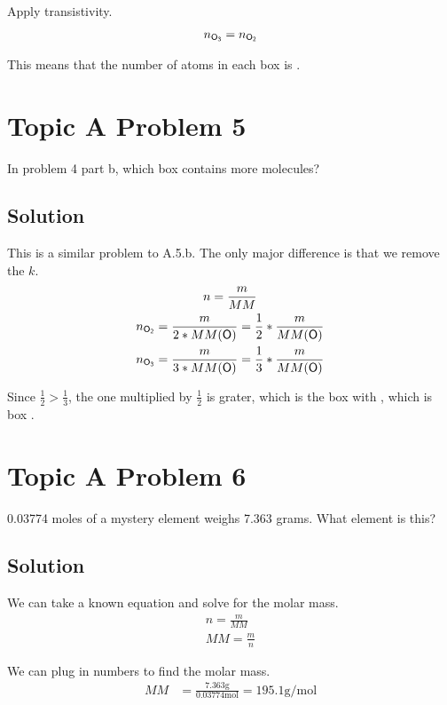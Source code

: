 \documentclass[10pt]{article}
\begin{document}
            Apply transistivity.
            \begin{gather}
                n_{\ce{O3}}   =   n_{\ce{O2}}
            \end{gather}

            This means that the number of atoms in each box is .


    \pagebreak
    \section{Topic A Problem 5}
        In problem 4 part b, which box contains more molecules?
        
        \subsection{Solution}
            This is a similar problem to A.5.b.
            The only major difference is that we remove the $k$.
            \begin{gather}
                n   =   \frac{m}{MM}\\
                n_{\ce{O2}} =   \frac{m}{2 * MM(\ce{O})} = \frac{1}{2} * \frac{m}{MM(\ce{O})}\\
                n_{\ce{O3}} =   \frac{m}{3 * MM(\ce{O})} = \frac{1}{3} * \frac{m}{MM(\ce{O})}
            \end{gather}

            Since $\frac{1}{2} > \frac{1}{3}$, the one multiplied by $\frac{1}{2}$ is grater, which is the box with , which is box .


    \pagebreak
    \section{Topic A Problem 6}
        0.03774 moles of a mystery element weighs 7.363 grams. What element is this? 
            
        \subsection{Solution}
            We can take a known equation and solve for the molar mass.
            \begin{gather}
                n   =   \frac{m}{MM}\\
                MM  =   \frac{m}{n}
            \end{gather}

            We can plug in numbers to find the molar mass.
            \begin{align}
                MM  &=  \frac{7.363 \unit{\gram}}{0.03774 \unit{\mole}}
                    =   195.1 \unit{\gram/\mole}
            \end{align}
\end{document}
